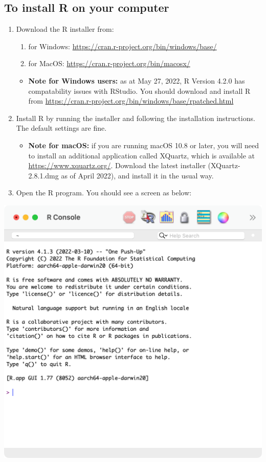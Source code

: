 \documentclass[
]{memoir}
\providecommand{\tightlist}{%
  \setlength{\itemsep}{0pt}\setlength{\parskip}{0pt}}
\begin{document}
\hypertarget{to-install-r-on-your-computer}{%
\subsection{To install R on your computer}\label{to-install-r-on-your-computer}}

\begin{enumerate}
\def\labelenumi{\arabic{enumi}.}
\item
  Download the R installer from:

  \begin{enumerate}
  \def\labelenumii{\alph{enumii}.}
  \tightlist
  \item
    for Windows: \url{https://cran.r-project.org/bin/windows/base/}
  \item
    for MacOS: \url{https://cran.r-project.org/bin/macosx/}
  \end{enumerate}

  \begin{itemize}
  \tightlist
  \item
    \textbf{Note for Windows users:} as at May 27, 2022, R Version 4.2.0 has compatability issues with RStudio. You should download and install R from \url{https://cran.r-project.org/bin/windows/base/rpatched.html}
  \end{itemize}
\item
  Install R by running the installer and following the installation instructions. The default settings are fine.

  \begin{itemize}
  \tightlist
  \item
    \textbf{Note for macOS:} if you are running macOS 10.8 or later, you will need to install an additional application called XQuartz, which is available at \url{https://www.xquartz.org/}. Download the latest installer (XQuartz-2.8.1.dmg as of April 2022), and install it in the usual way.
  \end{itemize}
\item
  Open the R program. You should see a screen as below:
\end{enumerate}

\includegraphics[width=0.8\linewidth]{img/R-screenshot}
\end{document}
